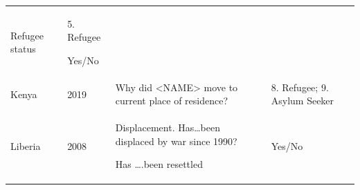 \documentclass[
]{article}
\begin{document}
\begin{longtable}[]{@{}llll@{}}
\begin{minipage}[t]{0.22\columnwidth}
Refugee status\strut
\end{minipage} & \begin{minipage}[t]{0.22\columnwidth}\raggedright
5. Refugee

Yes/No\strut
\end{minipage}\tabularnewline
\begin{minipage}[t]{0.22\columnwidth}\raggedright
Kenya\strut
\end{minipage} & \begin{minipage}[t]{0.22\columnwidth}\raggedright
2019\strut
\end{minipage} & \begin{minipage}[t]{0.22\columnwidth}\raggedright
Why did
\textless NAME\textgreater{} move
to current
place of
residence?\strut
\end{minipage} & \begin{minipage}[t]{0.22\columnwidth}\raggedright
8. Refugee;
9. Asylum
Seeker\strut
\end{minipage}\tabularnewline
\begin{minipage}[t]{0.22\columnwidth}\raggedright
Liberia\strut
\end{minipage} & \begin{minipage}[t]{0.22\columnwidth}\raggedright
2008\strut
\end{minipage} & \begin{minipage}[t]{0.22\columnwidth}\raggedright
Displacement.
Has\ldots been
displaced by
war since 1990?

Has \ldots.been
resettled\strut
\end{minipage} & \begin{minipage}[t]{0.22\columnwidth}\raggedright
Yes/No


\end{minipage}
\end{longtable}
\end{document}
